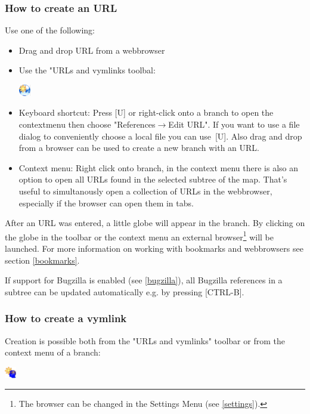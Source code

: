 \documentclass[12pt,a4paper]{article}
\newcommand{\ra}{$\longrightarrow$}
\newcommand{\key}[1]{[#1]}
\begin{document}
\subsubsection{How to create an URL} 
Use one of the following:
\begin{itemize}
\item{Drag and drop URL from a webbrowser}
\item{Use the "URLs and vymlinks toolbal:}
    \begin{center}
	\includegraphics[width=0.5cm]{images/flag-urlnew.png}
    \end{center}
\item{Keyboard shortcut:}
    Press \key{U} or right-click  onto a
    branch to open the contextmenu then choose "References\ra Edit URL". If
    you want to use a file dialog to conveniently choose a local file you
    can use~\key{U}. Also drag and drop from a browser can be used to create
    a new branch with an URL.
\item{Context menu:} 
    Right click onto branch,
    in the context menu there is also an option to open all URLs found
    in the selected subtree of the map. That's useful to simultanously open
    a collection of URLs in the webbrowser, especially if the browser can
    open them in tabs.

\end{itemize}

After an URL was entered, a little globe will appear in the branch. By
clicking on the globe in the toolbar or the context menu an external
browser\footnote{
    The browser can be changed in the Settings Menu (see \ref{settings}).}
will be launched.
For more information on working with bookmarks and webbrowsers see
section \ref{bookmarks}.

If support for Bugzilla is enabled (see \ref{bugzilla}), all Bugzilla
references in a subtree can be updated automatically e.g. by pressing
\key{CTRL-B}.

\subsubsection{How to create a vymlink}
Creation is possible both from the "URLs and vymlinks" toolbar or from
the context menu of a branch:
    \begin{center}
	\includegraphics[width=0.5cm]{images/flag-vymlinknew.png}
    \end{center}
\end{document}
